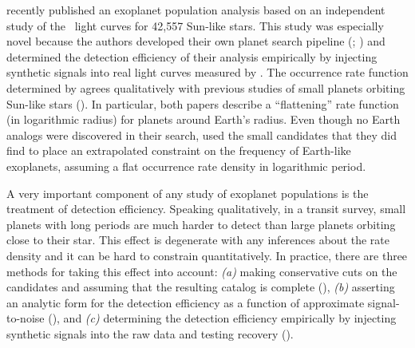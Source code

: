 \citet{Petigura:2013} recently published an exoplanet population analysis based on
an independent study of the \kepler\ light curves for 42,557 Sun-like stars.
This study was especially novel because the authors developed their own
planet search pipeline (\terra; \citealt{Petigura:2013a}) and determined the
detection efficiency of their analysis empirically by injecting synthetic
signals into real light curves measured by \kepler.
The occurrence rate function determined by \citet{Petigura:2013} agrees
qualitatively with previous studies of small planets orbiting Sun-like stars
(\citealt{Dong:2013}).
In particular, both papers describe a ``flattening'' rate function (in
logarithmic radius) for planets around Earth's radius.
Even though no Earth analogs were discovered in their search,
\citet{Petigura:2013}
used the small candidates that they did find to place an extrapolated
constraint on the frequency of Earth-like exoplanets, assuming a flat
occurrence rate density in logarithmic period.

A very important component of any study of exoplanet populations is the
treatment of detection efficiency.
Speaking qualitatively, in a transit survey, small planets with long periods
are much harder to detect than large planets orbiting close to their star.
This effect is degenerate with any inferences about the rate density and it
can be hard to constrain quantitatively.
In practice, there are three methods for taking this effect into account:
\emph{(a)} making conservative cuts on the candidates and assuming that the
resulting catalog is complete (\citealt{Catanzarite:2011, Traub:2012,
Tremaine:2012}), \emph{(b)} asserting an analytic form for the detection
efficiency as a function of approximate signal-to-noise (\citealt{Youdin:2011,
Howard:2012, Dressing:2013, Dong:2013, Fressin:2013, Morton:2014}), and
\emph{(c)} determining the detection efficiency empirically by injecting
synthetic signals into the raw data and testing recovery
(\citealt{Christiansen:2013, Petigura:2013a, Petigura:2013}).

